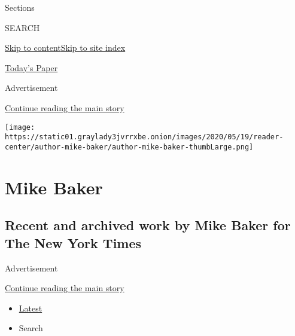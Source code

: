 Sections

SEARCH

\protect\hyperlink{site-content}{Skip to
content}\protect\hyperlink{site-index}{Skip to site index}

\href{https://myaccount.nytimes3xbfgragh.onion/auth/login?response_type=cookie\&client_id=vi}{}

\href{https://www.nytimes3xbfgragh.onion/section/todayspaper}{Today's
Paper}

Advertisement

\protect\hyperlink{after-top}{Continue reading the main story}

\texttt{[image: https://static01.graylady3jvrrxbe.onion/images/2020/05/19/reader-center/author-mike-baker/author-mike-baker-thumbLarge.png]}

\hypertarget{mike-baker}{%
\section{Mike Baker}\label{mike-baker}}

\hypertarget{recent-and-archived-work-by-mike-baker-for-the-new-york-times}{%
\subsection{Recent and archived work by Mike Baker for The New York
Times}\label{recent-and-archived-work-by-mike-baker-for-the-new-york-times}}

Advertisement

\protect\hyperlink{after-mid1}{Continue reading the main story}

\begin{itemize}
\tightlist
\item
  \protect\hyperlink{stream-panel}{Latest}
\item
  Search
\end{itemize}

